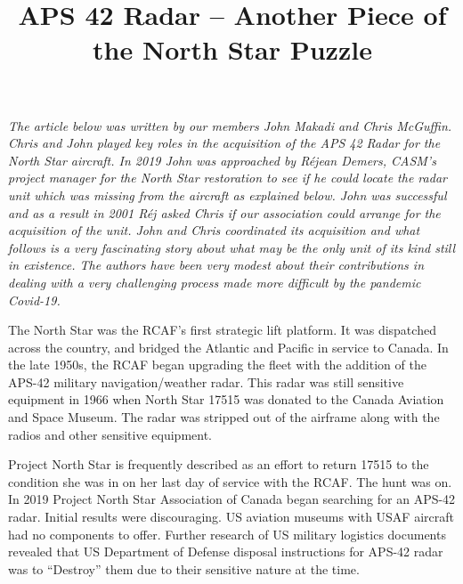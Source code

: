%


\title{APS 42 Radar -- Another Piece of the North Star Puzzle}


\maketitle


\textit{The article below was written by our members John Makadi and Chris McGuffin. Chris and John played key roles in the acquisition of the APS 42 Radar for the North Star aircraft. In 2019 John was approached by R\'{e}jean Demers, CASM's project manager for the North Star restoration to see if he could locate the radar unit which was missing from the aircraft as explained below. John was successful and as a result in 2001  R\'{e}j asked Chris if  our association  could arrange for the acquisition of the unit. John and Chris coordinated its acquisition and what follows is a very fascinating story about what may be the only unit of its kind still in existence. The authors have been very modest about their contributions in dealing with a very challenging process made more difficult by the pandemic Covid-19.}

The North Star was the RCAF’s first strategic lift platform. It was dispatched across the country, and bridged the Atlantic and Pacific in service to Canada. In the late 1950s, the RCAF began upgrading the fleet with the addition of the APS-42 military navigation/weather radar. This radar was still sensitive equipment in 1966 when North Star 17515 was donated to the Canada Aviation and Space Museum. The radar was stripped out of the airframe along with the radios and other sensitive equipment.

Project North Star is frequently described as an effort to return 17515 to the condition she was in on her last day of service with the RCAF. The hunt was on. In 2019 Project North Star Association of Canada began searching for an APS-42 radar. Initial results were discouraging. US aviation museums with USAF aircraft had no components to offer. Further research of US military logistics documents revealed that US Department of Defense disposal instructions for APS-42 radar was to “Destroy” them due to their sensitive nature at the time.


